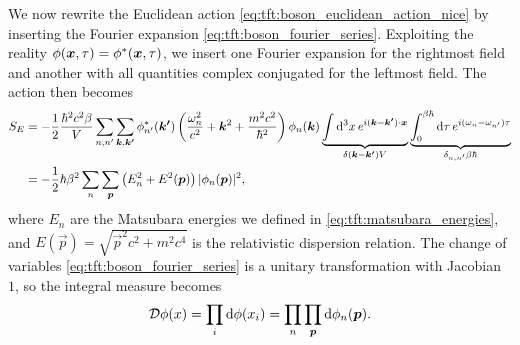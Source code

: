 
We now rewrite the Euclidean action \eqref{eq:tft:boson_euclidean_action_nice} by inserting the Fourier expansion \eqref{eq:tft:boson_fourier_series}.
Exploiting the reality $\phi({\bm{x}}, \tau) = {\phi}^*({\bm{x}}, \tau)$, we insert one Fourier expansion for the rightmost field and another with all quantities complex conjugated for the leftmost field.
The action then becomes
\begin{equation}
\begin{split}
	S_E & = -\frac12 \frac{\hbar^2 c^2 \beta}{V}
	        \sum_{n,n'} \sum_{{\bm{k}},{\bm{k'}}} 
	    	  {\phi}^*_{n'}({\bm{k'}}) 
	    	  \left( \frac{\omega_n^2}{c^2} + {\bm{k}}^2 + \frac{m^2 c^2}{\hbar^2} \right)
	  	  \phi_{n}({\bm{k}})
	  	  \underbrace{\int \mathop{}\!\mathrm{d}^3 x \, e^{i ({\bm{k}} - {\bm{k'}}) \cdot {\bm{x}}}}_{\delta({\bm{k}}-{\bm{k'}}) V}
	      \underbrace{\int_0^{\beta \hbar} \mathop{}\!\mathrm{d} \tau \, e^{i (\omega_n - \omega_{n'}) \tau}}_{\delta_{n,n'} \beta \hbar}
	  	  \\
	    & = -\frac12 \hbar \beta^2
	        \sum_n \sum_{\bm{p}}
	  	    \left( E_n^2 + E^2({\bm{p}}) \right)
		    \lvert \phi_{n}({\bm{p}}) \rvert^2 ,
\end{split}
\label{eq:tft:boson_action_fourier}
\end{equation}
where $E_n$ are the Matsubara energies we defined in \cref{eq:tft:matsubara_energies}, and $E(\vec{p}) = \sqrt{\vec{p}^2 c^2 + m^2 c^4}$ is the relativistic dispersion relation.
The change of variables \eqref{eq:tft:boson_fourier_series} is a unitary transformation with Jacobian $1$, so the integral measure becomes
\begin{equation}
	\mathcal{D} \phi(x) =
	\prod_i \mathop{}\!\mathrm{d} \phi(x_i) =
	\prod_n \prod_{\bm{p}} \mathop{}\!\mathrm{d} \phi_n({\bm{p}}) .
\label{eq:tft:boson_integral_new_variables}
\end{equation}

